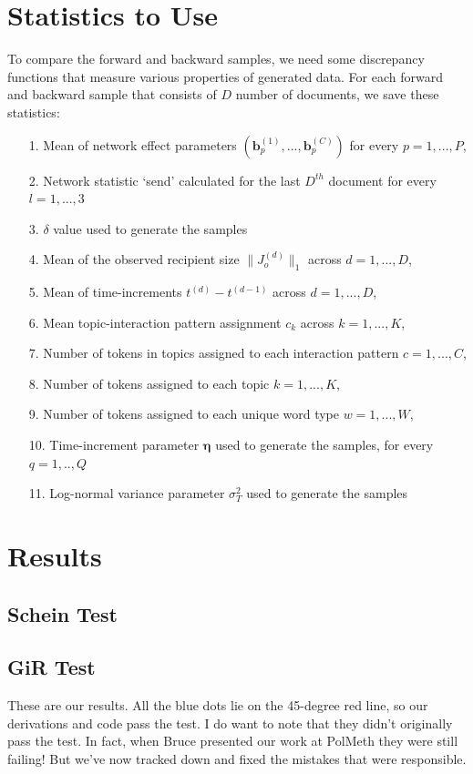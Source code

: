 \documentclass[a4paper]{article}
\begin{document}
\section{Statistics to Use}
To compare the forward and backward samples, we need some discrepancy functions that measure various properties of generated data. For each forward and backward sample that consists of $D$ number of documents, we save these statistics:
      \begin{itemize}
      	\item[1.] Mean of network effect parameters $(\boldsymbol{b}_p^{(1)},...,\boldsymbol{b}_p^{(C)})$ for every $p = 1,...,P$,
      	      	\item[2.] Network statistic `send' calculated for the last $D^{th}$ document for every $l=1,...,3$
      	      	\item[3.] $\delta$ value used to generate the samples
      	      	\item[4.] Mean of the observed recipient size $ \lVert J_o^{(d)} \rVert_1 $ across $d=1,...,D$,
      	\item[5.] Mean of time-increments $t^{(d)}-t^{(d-1)}$ across $d=1,...,D$,
      	\item[6.] Mean topic-interaction pattern assignment $c_k$ across $k=1,...,K$, 
      	\item[7.] Number of tokens in topics assigned to each interaction pattern $c=1,...,C$,
      	\item[8.] Number of tokens assigned to each topic $k=1,...,K$, 
       \item[9.] Number of tokens assigned to each unique word type $w=1,...,W$,
         \item[10.] Time-increment parameter $\boldsymbol{\eta}$ used to generate the samples, for every $q=1,..,Q$
         \item[11.] Log-normal variance parameter $\sigma_T^2$ used to generate the samples
      	      \end{itemize}

\section{Results}
\subsection{Schein Test}      	      


\subsection{GiR Test}      	 
These are our results. All the blue dots lie on the
45-degree red line, so our derivations and code pass the test. I do
want to note that they didn't originally pass the test. In fact, when
Bruce presented our work at PolMeth they were still failing! But we've
now tracked down and fixed the mistakes that were responsible.
\end{document}

